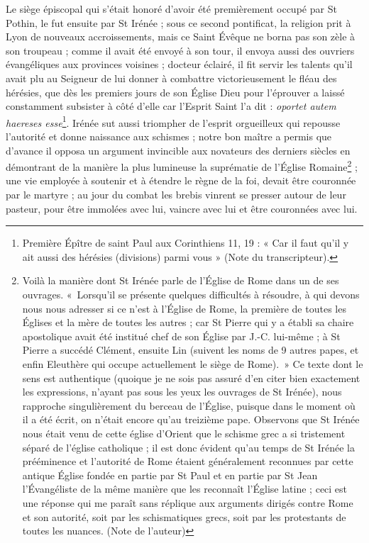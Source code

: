 \documentclass[11pt,a4paper]{report}
\begin{document}
Le siège épiscopal qui s'était honoré d'avoir été premièrement occupé par St Pothin, le fut ensuite par St Irénée ; sous ce second pontificat, la religion prit à Lyon de nouveaux accroissements, mais ce Saint Évêque ne borna pas son zèle à son troupeau ; comme il avait été envoyé à son tour, il envoya aussi des ouvriers évangéliques aux provinces voisines ; docteur éclairé, il fit servir les talents qu'il avait plu au Seigneur de lui donner à combattre victorieusement le fléau des hérésies, que dès les premiers jours de son Église Dieu pour l'éprouver a laissé constamment subsister à côté d'elle car l'Esprit Saint l'a dit : \textit{oportet autem haereses esse}\footnote{Première Épître de saint Paul aux Corinthiens 11, 19 : « Car il faut qu'il y ait aussi des hérésies (divisions) parmi vous » (Note du transcripteur).}. Irénée sut aussi triompher de l'esprit orgueilleux qui repousse l'autorité et donne naissance aux schismes ; notre bon maître a permis que d'avance il opposa un argument invincible aux novateurs des derniers siècles en démontrant de la manière la plus lumineuse la suprématie de l'Église Romaine\footnote{Voilà la manière dont St Irénée parle de l'Église de Rome dans un de ses ouvrages. «~Lorsqu'il se présente quelques difficultés à résoudre, à qui devons nous nous adresser si ce n'est à l'Église de Rome, la première de toutes les Églises et la mère de toutes les autres ; car St Pierre qui y a établi sa chaire apostolique avait été institué chef de son Église par J.-C. lui-même ; à St Pierre a succédé Clément, ensuite Lin (suivent les noms de 9 autres papes, et enfin Eleuthère qui occupe actuellement le siège de Rome).~» Ce texte dont le sens est authentique (quoique je ne sois pas assuré d'en citer bien exactement les expressions, n'ayant pas sous les yeux les ouvrages de St Irénée), nous rapproche singulièrement du berceau de l'Église, puisque dans le moment où il a été écrit, on n'était encore qu'au treizième pape. Observons que St Irénée nous était venu de cette église d'Orient que le schisme grec a si tristement séparé de l'église catholique ; il est donc évident qu'au temps de St Irénée la prééminence et l'autorité de Rome étaient généralement reconnues par cette antique Église fondée en partie par St Paul et en partie par St Jean l'Évangéliste de la même manière que les reconnaît l'Église latine ; ceci est une réponse qui me paraît sans réplique aux arguments dirigés contre Rome et son autorité, soit par les schismatiques grecs, soit par les protestants de toutes les nuances. (Note de l'auteur)} ; une vie employée à soutenir et à étendre le règne de la foi, devait être couronnée par le martyre ; au jour du combat les brebis vinrent se presser autour de leur pasteur, pour être immolées avec lui, vaincre avec lui et être couronnées avec lui.
\end{document}
